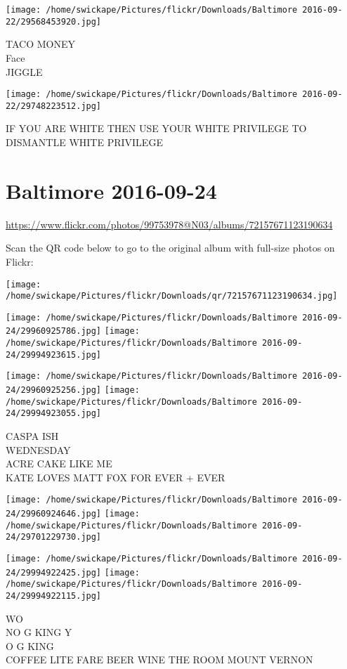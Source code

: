 \documentclass[10pt,letterpaper]{article}
\begin{document}
\vspace{0.25in}
\texttt{[image: /home/swickape/Pictures/flickr/Downloads/Baltimore 2016-09-22/29568453920.jpg]}

TACO MONEY\\
Face\\
JIGGLE
\pagebreak

\texttt{[image: /home/swickape/Pictures/flickr/Downloads/Baltimore 2016-09-22/29748223512.jpg]}

IF YOU ARE WHITE THEN USE YOUR WHITE PRIVILEGE TO DISMANTLE WHITE PRIVILEGE
\pagebreak

\section*{Baltimore 2016-09-24}

\url{https://www.flickr.com/photos/99753978@N03/albums/72157671123190634}

Scan the QR code below to go to the original album with full-size photos on Flickr:

\texttt{[image: /home/swickape/Pictures/flickr/Downloads/qr/72157671123190634.jpg]}
\pagebreak

\texttt{[image: /home/swickape/Pictures/flickr/Downloads/Baltimore 2016-09-24/29960925786.jpg]}
\texttt{[image: /home/swickape/Pictures/flickr/Downloads/Baltimore 2016-09-24/29994923615.jpg]}

\texttt{[image: /home/swickape/Pictures/flickr/Downloads/Baltimore 2016-09-24/29960925256.jpg]}
\texttt{[image: /home/swickape/Pictures/flickr/Downloads/Baltimore 2016-09-24/29994923055.jpg]}

CASPA ISH\\
WEDNESDAY\\
ACRE CAKE LIKE ME\\
KATE LOVES MATT FOX FOR EVER + EVER
\pagebreak

\texttt{[image: /home/swickape/Pictures/flickr/Downloads/Baltimore 2016-09-24/29960924646.jpg]}
\texttt{[image: /home/swickape/Pictures/flickr/Downloads/Baltimore 2016-09-24/29701229730.jpg]}

\texttt{[image: /home/swickape/Pictures/flickr/Downloads/Baltimore 2016-09-24/29994922425.jpg]}
\texttt{[image: /home/swickape/Pictures/flickr/Downloads/Baltimore 2016-09-24/29994922115.jpg]}

WO\\
NO G KING Y\\
O G KING\\
COFFEE LITE FARE BEER WINE THE ROOM MOUNT VERNON
\pagebreak
\end{document}
